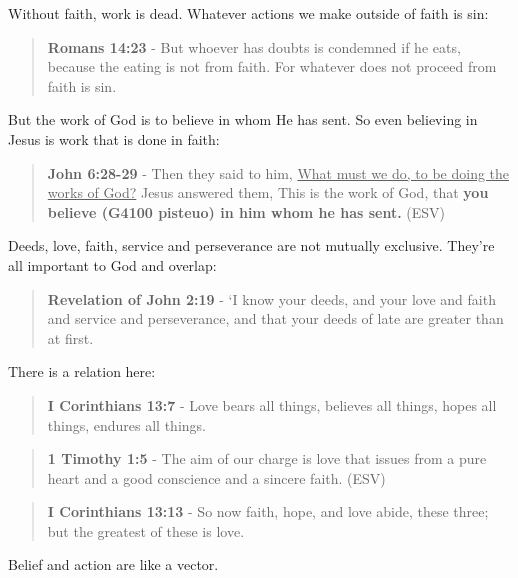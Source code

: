 \documentclass[11pt]{article}
\begin{document}
Without faith, work is dead. Whatever actions we make outside of faith is sin:

\begin{quote}
\textbf{Romans 14:23} - But whoever has doubts is condemned if he eats, because the eating is not from faith. For whatever does not proceed from faith is sin.
\end{quote}

But the work of God is to believe in whom He has sent. So even believing in Jesus is work that is done in faith:

\begin{quote}
\textbf{John 6:28-29} - Then they said to him, \uline{What must we do, to be doing the works of God?} Jesus answered them, This is the work of God, that \textbf{you believe (G4100 pisteuo) in him whom he has sent.} (ESV)
\end{quote}

Deeds, love, faith, service and perseverance are not mutually exclusive. They're all important to God and overlap:

\begin{quote}
\textbf{Revelation of John 2:19} - ‘I know your deeds, and your love and faith and service and perseverance, and that your deeds of late are greater than at first.
\end{quote}

There is a relation here:

\begin{quote}
\textbf{I Corinthians 13:7} - Love bears all things, believes all things, hopes all things, endures all things.
\end{quote}

\begin{quote}
\textbf{1 Timothy 1:5} -  The aim of our charge is love that issues from a pure heart and a good conscience and a sincere faith.  (ESV)
\end{quote}

\begin{quote}
\textbf{I Corinthians 13:13} - So now faith, hope, and love abide, these three; but the greatest of these is love.
\end{quote}

Belief and action are like a vector.
\end{document}
